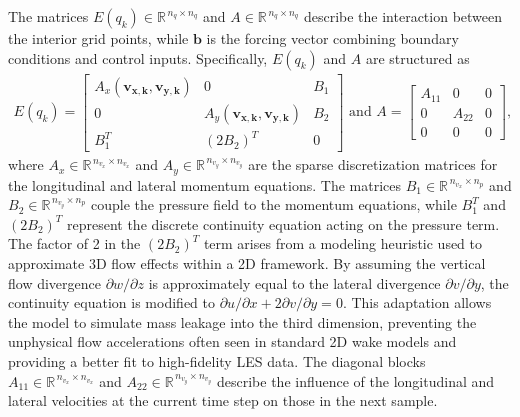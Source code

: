 The matrices $E(q_k) \in \mathbb{R}^{\,n_{q} \times n_{q}}$ and $A \in \mathbb{R}^{\,n_{q} \times n_{q}}$ describe the interaction between the interior grid points, while $\bm{b}$ is the forcing vector combining boundary conditions and control inputs. Specifically, $E(q_k)$ and  $A$ are structured as
\begin{align} \label{eq:AGrid}
    E(q_k) =
    \begin{bmatrix}
        A_x(\bm{v_{x,k}},\bm{v_{y,k}}) & 0   & B_1 \\
        0   & A_y(\bm{v_{x,k}},\bm{v_{y,k}}) & B_2 \\
        B_1^T   & (2 B_2)^T   & 0
    \end{bmatrix} \text{ and } 
  A =
\begin{bmatrix}
    A_{11} & 0   & 0 \\
    0   & A_{22} &0 \\
    0   & 0   & 0
\end{bmatrix},
\end{align}
where $A_x \in \mathbb{R}^{\,n_{v_x} \times n_{v_x}}$ and $A_y \in \mathbb{R}^{\,n_{v_y} \times n_{v_y}}$ are the sparse discretization matrices for the longitudinal and lateral momentum equations.  The matrices $B_1 \in \mathbb{R}^{\,n_{v_x} \times n_p}$ and $B_2 \in \mathbb{R}^{\,n_{v_y} \times n_p}$ couple the pressure field to the momentum equations, while $B_1^T$ and $(2 B_2)^T$ represent the discrete continuity equation acting on the pressure term. The factor of 2 in the $(2B_2)^T$ term arises from a modeling heuristic used to approximate 3D flow effects within a 2D framework. By assuming the vertical flow divergence $\partial w / \partial z$ is approximately equal to the lateral divergence $\partial v / \partial y$, the continuity equation is modified to $\partial u / \partial x + 2\partial v / \partial y = 0$. This adaptation allows the model to simulate mass leakage into the third dimension, preventing the unphysical flow accelerations often seen in standard 2D wake models and providing a better fit to high-fidelity LES data. The diagonal blocks $A_{11} \in \mathbb{R}^{\,n_{v_x} \times n_{v_x}}$ and $A_{22} \in \mathbb{R}^{\,n_{v_y} \times n_{v_y}}$ describe the influence of the longitudinal and lateral velocities at the current time step on those in the next sample.

